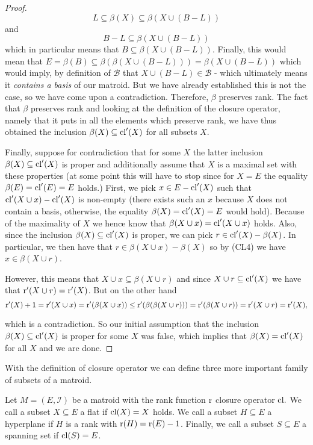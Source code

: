 \begin{proof}
$$L \subseteq \beta(X) \subseteq \beta(X \cup (B-L))$$ and $$B-L \subseteq \beta(X \cup (B-L))$$ which in particular means that $B \subseteq \beta(X \cup (B-L))$. Finally, this would mean that  
$E = \beta(B)\subseteq \beta(\beta(X \cup (B-L))) = \beta(X \cup (B-L))$ which would imply, by definition of $\mathcal{B}$ that $X \cup (B-L)
\in \mathcal{B}$ - which ultimately means it \textit{contains a basis} of our matroid. But we have already established this is not the case, so we have come upon a contradiction. Therefore, $\beta$ preserves rank.
The fact that $\beta$ preserves rank and looking at the definition of the closure operator, namely that it puts in all the elements which preserve rank, we have thus obtained the inclusion $\beta(X) \subseteq \mathrm{cl}'(X)$ for all subsets $X.$

Finally, suppose for contradiction that for some $X$ the latter inclusion $\beta(X) \subseteq \mathrm{cl}'(X)$ is proper and additionally assume that $X$ is a maximal set with these properties (at some point this will have to stop since for $X =E$ the equality $\beta(E) = \mathrm{cl}'(E) = E$ holds.) First, we pick $x \in E - \mathrm{cl}'(X)$ such that $\mathrm{cl}'(X\cup x) - \mathrm{cl}'(X)$ is non-empty (there exists such an $x$ because $X$ does not contain a basis, otherwise, the equality $\beta(X) = \mathrm{cl}'(X) = E$ would hold).
Because of the maximality of $X$ we hence know that $\beta(X\cup x) = \mathrm{cl}'(X \cup x)$ holds. Also, since the inclusion $\beta(X) \subseteq \mathrm{cl}'(X)$ is proper, we can pick $r \in \mathrm{cl}'(X) - \beta(X)$. In particular, we then have that $r \in \beta(X\cup x) - \beta(X)$ so by (CL4) we have $x \in \beta(X\cup r)$.

However, this means that $X \cup x \subseteq \beta(X\cup r)$ and since $X\cup r \subseteq \mathrm{cl}'(X)$ we have that $\operatorname{r}'(X\cup r) = 
\operatorname{r}'(X)$. But on the other hand $$\operatorname{r}'(X) + 1= \operatorname{r}'(X\cup x) = \operatorname{r}'(\beta(X\cup x))\leq \operatorname{r}'(\beta(\beta(X\cup r))) = \operatorname{r}'(\beta(X\cup r)) = \operatorname{r}'(X\cup r) = \operatorname{r}'(X),$$

which is a contradiction. So our initial assumption that the inclusion $\beta(X) \subseteq \mathrm{cl}'(X)$ is proper for some $X$ was false, which implies that $\beta(X) = \mathrm{cl}'(X)$ for all $X$ and we are done.

\end{proof}


With the definition of closure operator we can define three more important family of subsets of a matroid.

\begin{defn}\label{HP&SS}
    Let $M = (E, \mathcal{I})$ be a matroid with the rank function $\operatorname{r}$ closure operator $\mathrm{cl}.$ We call a subset $X \subseteq E$ a flat if $\mathrm{cl}(X) = X$ holds. We call a subset $H \subseteq E$ a hyperplane if $H$ is a rank with $\operatorname{r}(H) = \operatorname{r}(E)-1$. Finally, we call a subset $S \subseteq E$ a spanning set if $\mathrm{cl}(S) = E$.
\end{defn}

